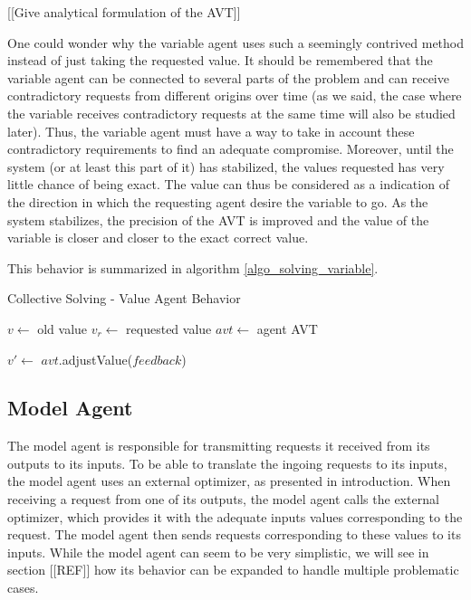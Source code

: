 
[[Give analytical formulation of the AVT]]

One could wonder why the variable agent uses such a seemingly contrived method instead of just taking the requested value. It should be remembered that the variable agent can be connected to several parts of the problem and can receive contradictory requests from different origins over time (as we said, the case where the variable receives contradictory requests at the same time will also be studied later). Thus, the variable agent must have a way to take in account these contradictory requirements to find an adequate compromise. Moreover, until the system (or at least this part of it) has stabilized, the values requested has very little chance of being exact. The value can thus be considered as a  indication of the direction in which the requesting agent desire the variable to go. As the system stabilizes, the precision of the AVT is improved and the value of the variable is closer and closer to the exact correct value.

This behavior is summarized in algorithm \ref{algo_solving_variable}.

\begin{algorithm}
\caption{Collective Solving - Value Agent Behavior}
\label{algo_solving_variable}

	$v \leftarrow$ old value\;
	$v_r \leftarrow$ requested value\;
	$avt \leftarrow$ agent AVT \;
	
	$v' \leftarrow$ $avt$.adjustValue($feedback$)\;
	
\end{algorithm}

\subsection{Model Agent}

The model agent is responsible for transmitting requests it received from its outputs to its inputs. To be able to translate the ingoing requests to its inputs, the model agent uses an external optimizer, as presented in introduction. When receiving a request from one of its outputs, the model agent calls the external optimizer, which provides it with the adequate inputs values corresponding to the request. The model agent then sends requests corresponding to these values to its inputs.
While the model agent can seem to be very simplistic, we will see in section [[REF]] how its 
behavior can be expanded to handle multiple problematic cases.


